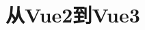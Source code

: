 \documentclass[openany]{book}
\begin{document}
\maketitle
\tableofcontents

\part{从Vue2到Vue3}
% 
\end{document}

